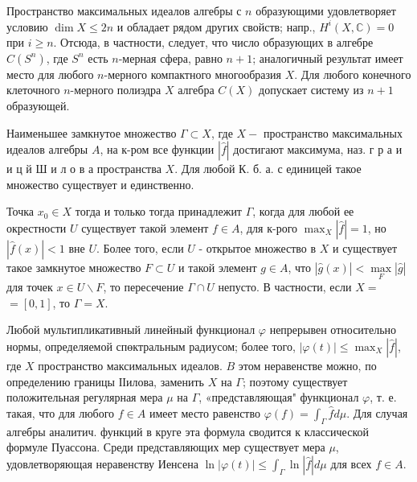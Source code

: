 \documentclass[10pt]{article}
\begin{document}
Пространство максимальных идеалов алгебры с $n$ образующими удовлетворяет условию $\operatorname{dim} X \leqslant 2 n$ и обладает рядом других свойств; напр., $H^{i}(X, \mathbb{C})=0$ при $i \geqslant n$. Отсюда, в частности, следует, что число образующих в алгебре $C\left(S^{n}\right)$, где $S^{n}$ есть $n$-мерная сфера, равно $n+1$; аналогичный результат имеет место для любого $n$-мерного компактного многообразия $X$. Для любого конечного клеточного $n$-мерного полиэдра $X$ алгебра $C(X)$ допускает систему из $n+1$ образующей.



Наименьшее замкнутое множество $\Gamma \subset X$, где $X-$ пространство максимальных идеалов алгебры $A$, на к-ром все функции $|\hat{f}|$ достигают максимума, наз. г р а и и ц й Ш и л о в а пространства $X$. Для любой К. б. а. с единицей такое множество существует и единственно.



Точка $x_{0} \in X$ тогда и только тогда принадлежит $\Gamma$, когда для любой ее окрестности $U$ существует такой элемент $f \in A$, для к-рого $\max _{X}|\hat{f}|=1$, но $|\hat{f}(x)|<1$ вне $U$. Более того, если $U$ - открытое множество в $X$ и существует такое замкнутое множество $F \subset U$ и такой элемент $g \in A$, что $|\hat{g}(x)|<\underset{F}{\max }|\hat{g}|$ для точек $x \in U \backslash F$, то пересечение $\Gamma \cap U$ непусто. В частности, если $X=$ $=[0,1]$, то $\Gamma=X$.



Любой мультипликативный линейный функционал $\varphi$ непрерывен относительно нормы, определяемой спөктральным радиусом; более того, $|\varphi(t)| \leqslant \max _{X}|\hat{f}|$, где $X$ пространство максимальных идеалов. $B$ этом неравенстве можно, по определению границы ІІилова, заменить $X$ на $\Gamma$; поэтому существует положительная регулярная мера $\mu$ на $\Gamma$, «представляющая" функционал $\varphi$, т. е. такая, что для любого $f \in A$ имеет место равенство $\varphi(f)=\int_{\Gamma} \hat{f} d \mu$. Для случая алгебры аналитич. функций в круге эта формула сводится к классической формуле Пуассона. Среди представляющих мер существует мера $\mu$, удовлетворяющая неравенству Иенсена $\ln |\varphi(t)| \leqslant \int_{\Gamma} \ln |\hat{f}| d \mu$ для всех $f \in A$.
\end{document}
